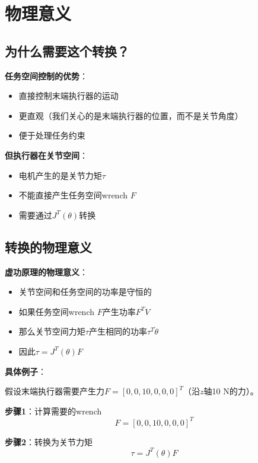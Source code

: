 \documentclass[12pt,a4paper]{article}
\begin{document}
\section{物理意义}

\subsection{为什么需要这个转换？}

\textbf{任务空间控制的优势}：
\begin{itemize}
\item 直接控制末端执行器的运动
\item 更直观（我们关心的是末端执行器的位置，而不是关节角度）
\item 便于处理任务约束
\end{itemize}

\textbf{但执行器在关节空间}：
\begin{itemize}
\item 电机产生的是关节力矩$\tau$
\item 不能直接产生任务空间wrench $F$
\item 需要通过$J^T(\theta)$转换
\end{itemize}

\subsection{转换的物理意义}

\textbf{虚功原理的物理意义}：
\begin{itemize}
\item 关节空间和任务空间的功率是守恒的
\item 如果任务空间wrench $F$产生功率$F^T V$
\item 那么关节空间力矩$\tau$产生相同的功率$\tau^T\dot{\theta}$
\item 因此$\tau = J^T(\theta)F$
\end{itemize}

\textbf{具体例子}：

假设末端执行器需要产生力$F = [0, 0, 10, 0, 0, 0]^T$（沿$z$轴10 N的力）。

\textbf{步骤1}：计算需要的wrench
\begin{equation}
F = [0, 0, 10, 0, 0, 0]^T
\end{equation}

\textbf{步骤2}：转换为关节力矩
\begin{equation}
\tau = J^T(\theta)F
\end{equation}
\end{document}
